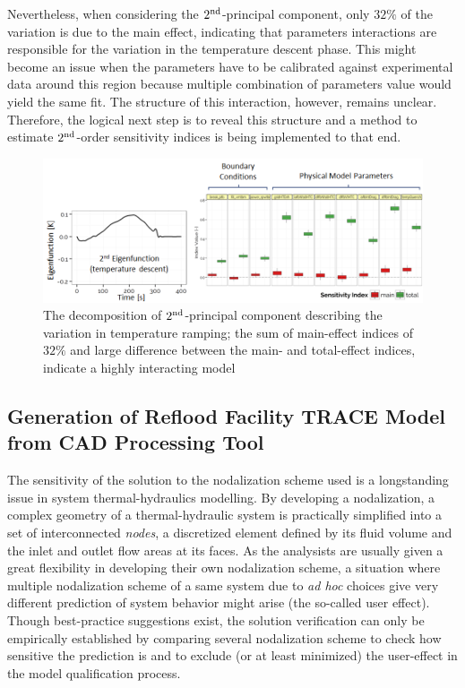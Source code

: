 \documentclass[11pt,titlepage]{article}
\begin{document}
Nevertheless, when considering the $2^\textnormal{nd}$-principal component, only $32\%$ of the variation is due to the main effect, indicating that parameters interactions are responsible for the variation in the temperature descent phase.
This might become an issue when the parameters have to be calibrated against experimental data around this region because multiple combination of parameters value would yield the same fit.
The structure of this interaction, however, remains unclear.
Therefore, the logical next step is to reveal this structure and a method to estimate $2^\textnormal{nd}$-order sensitivity indices is being implemented to that end.

\begin{figure}[h!]
	\centering
	\includegraphics[scale=0.65]{figures/2ndPrincipalComponent.png}
	\caption{The decomposition of $2^\textnormal{nd}$-principal component describing the variation in temperature ramping; the sum of main-effect indices of $32\%$ and large difference between the main- and total-effect indices, indicate a highly interacting model}
	\label{fig:2ndpc}
\end{figure}

\subsection{Generation of Reflood Facility TRACE Model from CAD Processing Tool} 

The sensitivity of the solution to the nodalization scheme used is a longstanding issue in system thermal-hydraulics modelling.
By developing a nodalization, a complex geometry of a thermal-hydraulic system is practically simplified into a set of interconnected \emph{nodes}, a discretized element defined by its fluid volume and the inlet and outlet flow areas at its faces. 
As the analysists are usually given a great flexibility in developing their own nodalization scheme, a situation where multiple nodalization scheme of a same system due to \textit{ad hoc} choices give very different prediction of system behavior might arise (the so-called user effect).
Though best-practice suggestions exist, the solution verification can only be empirically established by comparing several nodalization scheme to check how sensitive the prediction is and to exclude (or at least minimized) the user-effect in the model qualification process.
\end{document}
